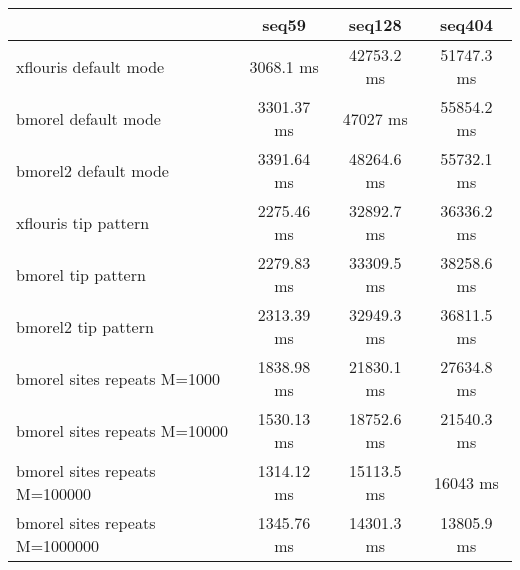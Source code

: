 \begin{tabular}{|l|c|c|c|}
\hline
 & seq59 & seq128 & seq404 \\
\hline
xflouris default mode & 3068.1 ms & 42753.2 ms & 51747.3 ms\\
\hline
bmorel default mode & 3301.37 ms & 47027 ms & 55854.2 ms\\
\hline
bmorel2 default mode & 3391.64 ms & 48264.6 ms & 55732.1 ms\\
\hline
xflouris tip pattern & 2275.46 ms & 32892.7 ms & 36336.2 ms\\
\hline
bmorel tip pattern & 2279.83 ms & 33309.5 ms & 38258.6 ms\\
\hline
bmorel2 tip pattern & 2313.39 ms & 32949.3 ms & 36811.5 ms\\
\hline
bmorel sites repeats M=1000 & 1838.98 ms & 21830.1 ms & 27634.8 ms\\
\hline
bmorel sites repeats M=10000 & 1530.13 ms & 18752.6 ms & 21540.3 ms\\
\hline
bmorel sites repeats M=100000 & 1314.12 ms & 15113.5 ms & 16043 ms\\
\hline
bmorel sites repeats M=1000000 & 1345.76 ms & 14301.3 ms & 13805.9 ms\\
\hline
\end{tabular}
